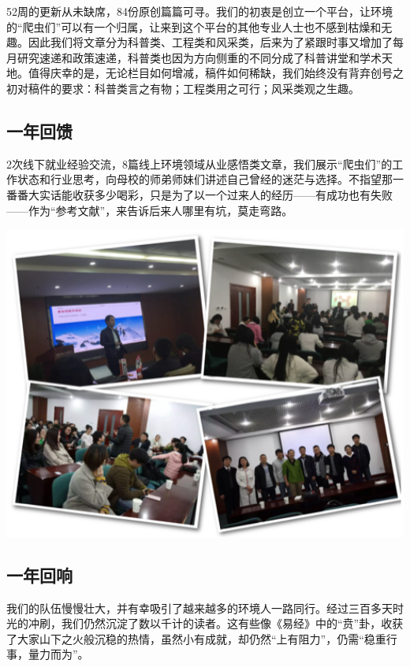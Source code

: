 \documentclass[
]{book}
\begin{document}
52周的更新从未缺席，84份原创篇篇可寻。我们的初衷是创立一个平台，让环境的``爬虫们''可以有一个归属，让来到这个平台的其他专业人士也不感到枯燥和无趣。因此我们将文章分为科普类、工程类和风采类，后来为了紧跟时事又增加了每月研究速递和政策速递，科普类也因为方向侧重的不同分成了科普讲堂和学术天地。值得庆幸的是，无论栏目如何增减，稿件如何稀缺，我们始终没有背弃创号之初对稿件的要求：科普类言之有物；工程类用之可行；风采类观之生趣。

\hypertarget{ux4e00ux5e74ux56deux9988}{%
\subsection{一年回馈}\label{ux4e00ux5e74ux56deux9988}}

2次线下就业经验交流，8篇线上环境领域从业感悟类文章，我们展示``爬虫们''的工作状态和行业思考，向母校的师弟师妹们讲述自己曾经的迷茫与选择。不指望那一番番大实话能收获多少喝彩，只是为了以一个过来人的经历------有成功也有失败------作为``参考文献''，来告诉后来人哪里有坑，莫走弯路。

\includegraphics[width=6.67in]{images/oneyear2}

\hypertarget{ux4e00ux5e74ux56deux54cd}{%
\subsection{一年回响}\label{ux4e00ux5e74ux56deux54cd}}

我们的队伍慢慢壮大，并有幸吸引了越来越多的环境人一路同行。经过三百多天时光的冲刷，我们仍然沉淀了数以千计的读者。这有些像《易经》中的``贲''卦，收获了大家山下之火般沉稳的热情，虽然小有成就，却仍然``上有阻力''，仍需``稳重行事，量力而为''。
\end{document}
